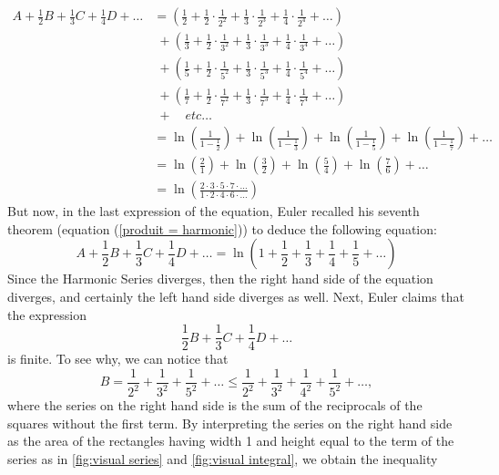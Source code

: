\begin{align*}
    A + \frac{1}{2}B + \frac{1}{3}C + \frac{1}{4}D + \dots &= \left(\frac{1}{2} + \frac{1}{2}\cdot \frac{1}{2^2} + \frac{1}{3}\cdot\frac{1}{2^3} + \frac{1}{4}\cdot\frac{1}{2^4} + \dots \right) \\
    & \! \; + \left(\frac{1}{3} + \frac{1}{2}\cdot \frac{1}{3^2} + \frac{1}{3}\cdot\frac{1}{3^3} + \frac{1}{4}\cdot\frac{1}{3^4} + \dots \right) \\
    & \! \; + \left(\frac{1}{5} + \frac{1}{2}\cdot \frac{1}{5^2} + \frac{1}{3}\cdot\frac{1}{5^3} + \frac{1}{4}\cdot\frac{1}{5^4} + \dots \right) \\
    & \! \; + \left(\frac{1}{7} + \frac{1}{2}\cdot \frac{1}{7^2} + \frac{1}{3}\cdot\frac{1}{7^3} + \frac{1}{4}\cdot\frac{1}{7^4} + \dots \right) \\
    & \! \; + \quad  etc\dots \\
    &= \ln\left(\frac{1}{1 - \frac{1}{2}}\right) + \ln\left(\frac{1}{1 - \frac{1}{3}}\right) + \ln\left(\frac{1}{1 - \frac{1}{5}}\right) + \ln\left(\frac{1}{1 - \frac{1}{7}}\right) + \dots \\
    &= \ln\left(\frac{2}{1}\right) + \ln\left(\frac{3}{2}\right) + \ln\left(\frac{5}{4}\right) + \ln\left(\frac{7}{6}\right) + \dots \\
    &= \ln\left(\frac{2\cdot 3 \cdot 5 \cdot 7 \cdot \dots}{1\cdot 2 \cdot 4 \cdot 6 \cdot \dots}\right)
\end{align*}
But now, in the last expression of the equation, Euler recalled his seventh theorem (equation (\ref{produit = harmonic})) to deduce the following equation:
\begin{equation} \label{A + B/2 + ...  = ln(infty)}
    A + \frac{1}{2}B + \frac{1}{3}C + \frac{1}{4}D + \dots = \ln\left(1 + \frac{1}{2} + \frac{1}{3} + \frac{1}{4} + \frac{1}{5} + \dots\right)
\end{equation}
Since the Harmonic Series diverges, then the right hand side of the equation diverges, and certainly the left hand side diverges as well. Next, Euler claims that the expression
$$\frac{1}{2}B + \frac{1}{3}C + \frac{1}{4}D + \dots$$
is finite. To see why, we can notice that
$$B = \frac{1}{2^2} + \frac{1}{3^2} + \frac{1}{5^2} + \dots \leq \frac{1}{2^2} + \frac{1}{3^2} + \frac{1}{4^2} + \frac{1}{5^2} + \dots,$$
where the series on the right hand side is the sum of the reciprocals of the squares without the first term. By interpreting the series on the right hand side as the area of the rectangles having width 1 and height equal to the term of the series as in \autoref{fig:visual series} and \autoref{fig:visual integral}, we obtain the inequality
